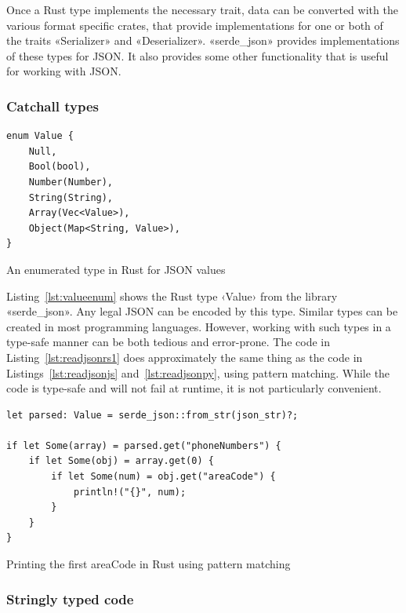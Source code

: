 Once a Rust type implements the necessary trait, data can be converted with the various format specific crates, that provide implementations for one or both of the traits «Serializer» and «Deserializer». «serde_json»\cite{serdejson} provides implementations of these types for JSON. It also provides some other functionality that is useful for working with JSON.

\subsubsection{Catchall types}

\begin{listing}[ht!]
\begin{verbatim}
enum Value {
    Null,
    Bool(bool),
    Number(Number),
    String(String),
    Array(Vec<Value>),
    Object(Map<String, Value>),
}
\end{verbatim}
\caption{An enumerated type in Rust for JSON values}
\label{lst:valueenum}
\end{listing}

Listing~\ref{lst:valueenum} shows the Rust type ‹Value› from the library «serde_json». Any legal JSON can be encoded by this type. Similar types can be created in most programming languages. However, working with such types in a type-safe manner can be both tedious and error-prone. The code in Listing~\ref{lst:readjsonrs1} does approximately the same thing as the code in Listings~\ref{lst:readjsonjs} and~\ref{lst:readjsonpy}, using pattern matching. While the code is type-safe and will not fail at runtime, it is not particularly convenient.

\begin{listing}[ht!]
\begin{verbatim}
let parsed: Value = serde_json::from_str(json_str)?;

if let Some(array) = parsed.get("phoneNumbers") {
    if let Some(obj) = array.get(0) {
        if let Some(num) = obj.get("areaCode") {
            println!("{}", num);
        }
    }
}
\end{verbatim}
\caption{Printing the first areaCode in Rust using pattern matching}
\label{lst:readjsonrs1}
\end{listing}


\subsubsection{Stringly typed code}

